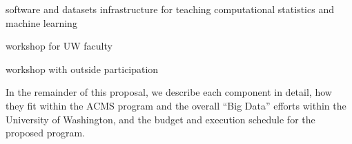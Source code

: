  \bits
  \item software and datasets infrastructure for teaching computational statistics and machine learning 
  \item workshop for UW faculty %
  \item workshop with outside participation 
 \eits
\eits  

In the remainder of this proposal, we describe each component in
detail, how they fit within the ACMS program and the overall ``Big
Data'' efforts within the University of Washington, and the budget and
execution schedule for the proposed program.



